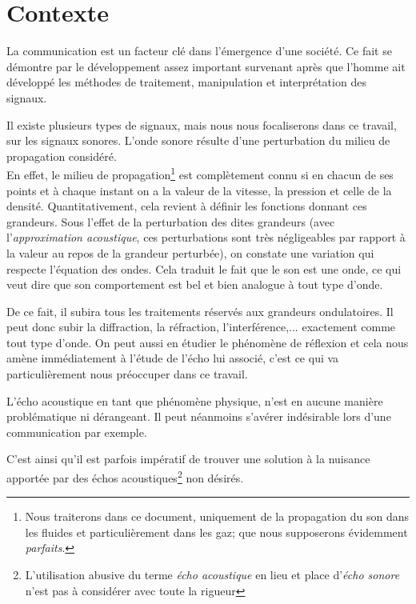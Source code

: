 \section{Contexte}
La communication est un facteur clé dans l'émergence d'une société. Ce fait se démontre par le développement assez important survenant après que l'homme ait développé les méthodes de traitement, manipulation et interprétation des signaux.

Il existe plusieurs types de signaux, mais nous nous focaliserons dans ce travail, sur les signaux sonores. L'onde sonore résulte d'une perturbation du milieu de propagation considéré.\\
En effet, le milieu de propagation\footnote{Nous traiterons dans ce document, uniquement de la propagation du son dans les fluides et particulièrement dans les gaz; que nous supposerons évidemment \emph{parfaits}.} est complètement connu si en chacun de ses points et à chaque instant on a la valeur de la vitesse, la pression et celle de la densité. Quantitativement, cela revient à définir les fonctions donnant ces grandeurs. Sous l'effet de la perturbation des dites grandeurs (avec l'\emph{approximation acoustique}\cite{Acoust}, ces perturbations sont très négligeables par rapport à la valeur au repos de la grandeur perturbée), on constate une variation qui respecte l'équation des ondes. Cela traduit le fait que le son est une onde, ce qui veut dire que son comportement est bel et bien analogue à tout type d'onde.

De ce fait, il subira tous les traitements réservés aux grandeurs ondulatoires. Il peut donc subir la diffraction, la réfraction, l'interférence,... exactement comme tout type d'onde.
On peut aussi en étudier le phénomène de réflexion et cela nous amène immédiatement à l'étude de l'écho lui associé, c'est ce qui va particulièrement nous préoccuper dans ce travail.%

L'écho acoustique en tant que phénomène physique, n'est en aucune manière problématique ni dérangeant. Il peut néanmoins s'avérer indésirable lors d'une communication par exemple.

C'est ainsi qu'il est parfois impératif de trouver une solution à la nuisance apportée par des échos acoustiques\footnote{L'utilisation abusive du terme \emph{écho acoustique} en lieu et place d'\emph{écho sonore} n'est pas à considérer avec toute la rigueur}
 non désirés.
